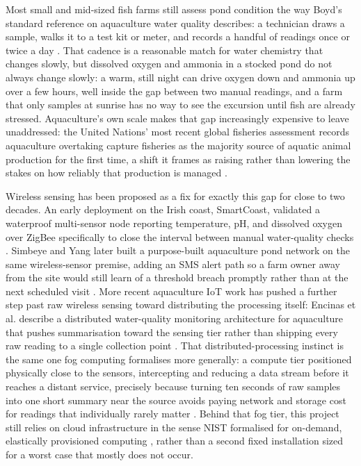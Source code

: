 \documentclass[conference]{IEEEtran}
\begin{document}
Most small and mid-sized fish farms still assess pond condition the way Boyd's standard reference on aquaculture water quality describes: a technician draws a sample, walks it to a test kit or meter, and records a handful of readings once or twice a day \cite{ref1}. That cadence is a reasonable match for water chemistry that changes slowly, but dissolved oxygen and ammonia in a stocked pond do not always change slowly: a warm, still night can drive oxygen down and ammonia up over a few hours, well inside the gap between two manual readings, and a farm that only samples at sunrise has no way to see the excursion until fish are already stressed. Aquaculture's own scale makes that gap increasingly expensive to leave unaddressed: the United Nations' most recent global fisheries assessment records aquaculture overtaking capture fisheries as the majority source of aquatic animal production for the first time, a shift it frames as raising rather than lowering the stakes on how reliably that production is managed \cite{ref2}.

Wireless sensing has been proposed as a fix for exactly this gap for close to two decades. An early deployment on the Irish coast, SmartCoast, validated a waterproof multi-sensor node reporting temperature, pH, and dissolved oxygen over ZigBee specifically to close the interval between manual water-quality checks \cite{ref3}. Simbeye and Yang later built a purpose-built aquaculture pond network on the same wireless-sensor premise, adding an SMS alert path so a farm owner away from the site would still learn of a threshold breach promptly rather than at the next scheduled visit \cite{ref4}. More recent aquaculture IoT work has pushed a further step past raw wireless sensing toward distributing the processing itself: Encinas et al. describe a distributed water-quality monitoring architecture for aquaculture that pushes summarisation toward the sensing tier rather than shipping every raw reading to a single collection point \cite{ref5}. That distributed-processing instinct is the same one fog computing formalises more generally: a compute tier positioned physically close to the sensors, intercepting and reducing a data stream before it reaches a distant service, precisely because turning ten seconds of raw samples into one short summary near the source avoids paying network and storage cost for readings that individually rarely matter \cite{ref6}. Behind that fog tier, this project still relies on cloud infrastructure in the sense NIST formalised for on-demand, elastically provisioned computing \cite{ref7}, rather than a second fixed installation sized for a worst case that mostly does not occur.
\end{document}
